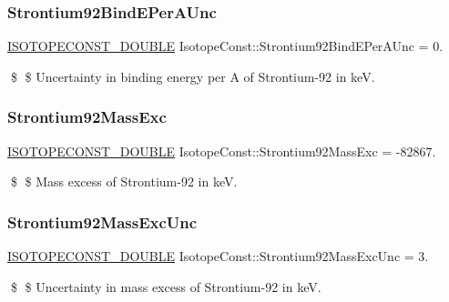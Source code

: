 \subsubsection{\texorpdfstring{Strontium92\+Bind\+E\+Per\+A\+Unc}{Strontium92BindEPerAUnc}}
{\footnotesize\ttfamily \mbox{\hyperlink{group___isotope_const-_macros_ga8f45a7272ce02c0b4c65c44636ed719a}{I\+S\+O\+T\+O\+P\+E\+C\+O\+N\+S\+T\+\_\+\+D\+O\+U\+B\+LE}} Isotope\+Const\+::\+Strontium92\+Bind\+E\+Per\+A\+Unc = 0.}

\$ \$ Uncertainty in binding energy per A of Strontium-\/92 in keV. \mbox{\label{group___isotope_const-_strontium-_sr92_gac0f53467afe66ca08f98172050ae32b9}} 
\subsubsection{\texorpdfstring{Strontium92\+Mass\+Exc}{Strontium92MassExc}}
{\footnotesize\ttfamily \mbox{\hyperlink{group___isotope_const-_macros_ga8f45a7272ce02c0b4c65c44636ed719a}{I\+S\+O\+T\+O\+P\+E\+C\+O\+N\+S\+T\+\_\+\+D\+O\+U\+B\+LE}} Isotope\+Const\+::\+Strontium92\+Mass\+Exc = -\/82867.}

\$ \$ Mass excess of Strontium-\/92 in keV. \mbox{\label{group___isotope_const-_strontium-_sr92_gaddc66692411d13dd02e03ec84b94b60e}} 
\subsubsection{\texorpdfstring{Strontium92\+Mass\+Exc\+Unc}{Strontium92MassExcUnc}}
{\footnotesize\ttfamily \mbox{\hyperlink{group___isotope_const-_macros_ga8f45a7272ce02c0b4c65c44636ed719a}{I\+S\+O\+T\+O\+P\+E\+C\+O\+N\+S\+T\+\_\+\+D\+O\+U\+B\+LE}} Isotope\+Const\+::\+Strontium92\+Mass\+Exc\+Unc = 3.}

\$ \$ Uncertainty in mass excess of Strontium-\/92 in keV. \mbox{\label{group___isotope_const-_strontium-_sr92_ga0f658e5863ecad69a2f6fabb8886d782}} 
